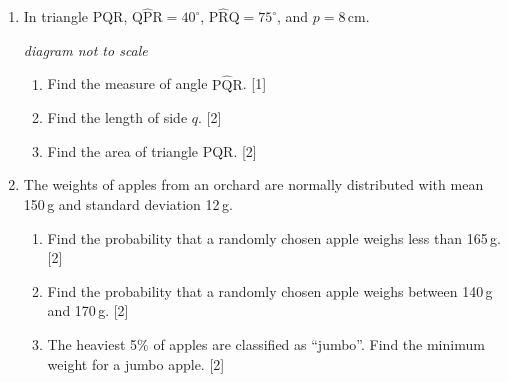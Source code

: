 \documentclass[12pt, twoside]{article}
\begin{document}
\begin{enumerate}[itemsep=0.15cm]
\newpage

\item[6.] [Maximum mark: 5]

In triangle PQR, $\mathrm{Q\hat{P}R} = 40^\circ$,
$\mathrm{P\hat{R}Q} = 75^\circ$, and $p = 8$\,cm.

\begin{center}

\textit{diagram not to scale}
\end{center}

\begin{enumerate}[itemsep=0.1cm]
  \item Find the measure of angle $\mathrm{P\hat{Q}R}$. \hfill [1]
  \item Find the length of side $q$. \hfill [2]
  \item Find the area of triangle PQR. \hfill [2]
\end{enumerate}


\newpage

\item[7.] [Maximum mark: 6]

The weights of apples from an orchard are normally distributed with mean
150\,g and standard deviation 12\,g.

\begin{enumerate}[itemsep=0.1cm]
  \item Find the probability that a randomly chosen apple weighs less than
        165\,g. \hfill [2]
  \item Find the probability that a randomly chosen apple weighs between
        140\,g and 170\,g. \hfill [2]
  \item The heaviest 5\% of apples are classified as ``jumbo''. Find the
        minimum weight for a jumbo apple. \hfill [2]
\end{enumerate}


\end{enumerate}
\end{document}
